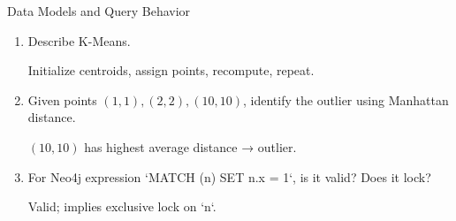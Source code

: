 \documentclass{article}
\begin{document}
\begin{exercise}{Data Models and Query Behavior}
  \begin{enumerate}
    \item Describe K-Means. \begin{solution}
      Initialize centroids, assign points, recompute, repeat.
    \end{solution}
    \item Given points $(1,1), (2,2), (10,10)$, identify the outlier using Manhattan distance. \begin{solution}
      $(10,10)$ has highest average distance → outlier.
    \end{solution}
    \item For Neo4j expression `MATCH (n) SET n.x = 1`, is it valid? Does it lock? \begin{solution}
      Valid; implies exclusive lock on `n`.
    \end{solution}
  \end{enumerate}
\end{exercise}
\end{document}
